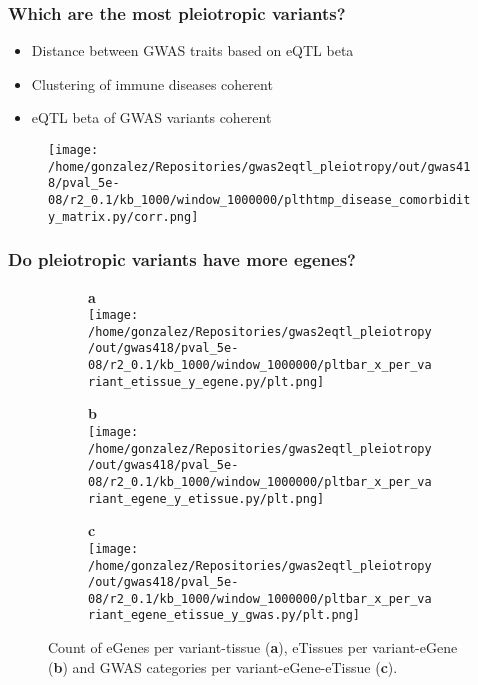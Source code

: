 \documentclass{beamer}
\begin{document}


\begin{frame}
\frametitle{Which are the most pleiotropic variants?}

\begin{itemize}
\item Distance between GWAS traits based on eQTL beta
\item Clustering of immune diseases coherent
\item eQTL beta of GWAS variants coherent
\end{itemize}

\begin{figure}[!]
\texttt{[image: /home/gonzalez/Repositories/gwas2eqtl\_pleiotropy/out/gwas418/pval\_5e-08/r2\_0.1/kb\_1000/window\_1000000/plthtmp\_disease\_comorbidity\_matrix.py/corr.png]}
\end{figure}

\end{frame}


\begin{frame}
\frametitle{Do pleiotropic variants have more egenes?}

\begin{figure}[!tbp]
\centering
%
\begin{subfigure}[]{.32\textwidth}
\textbf{a}
\\
\texttt{[image: /home/gonzalez/Repositories/gwas2eqtl\_pleiotropy/out/gwas418/pval\_5e-08/r2\_0.1/kb\_1000/window\_1000000/pltbar\_x\_per\_variant\_etissue\_y\_egene.py/plt.png]}
\end{subfigure}
%
\begin{subfigure}[]{.32\textwidth}
\textbf{b}
\\
\texttt{[image: /home/gonzalez/Repositories/gwas2eqtl\_pleiotropy/out/gwas418/pval\_5e-08/r2\_0.1/kb\_1000/window\_1000000/pltbar\_x\_per\_variant\_egene\_y\_etissue.py/plt.png]}
\end{subfigure}
%
\begin{subfigure}[]{.32\textwidth}
\textbf{c}
\\
\texttt{[image: /home/gonzalez/Repositories/gwas2eqtl\_pleiotropy/out/gwas418/pval\_5e-08/r2\_0.1/kb\_1000/window\_1000000/pltbar\_x\_per\_variant\_egene\_etissue\_y\_gwas.py/plt.png]}
\end{subfigure}
%
\caption{Count of eGenes per variant-tissue (\textbf{a}), eTissues per variant-eGene (\textbf{b}) and GWAS categories per variant-eGene-eTissue (\textbf{c}).} \label{fig:gwas_egene_etisue_per_variant}
%
\end{figure}

\end{frame}
\end{document}
